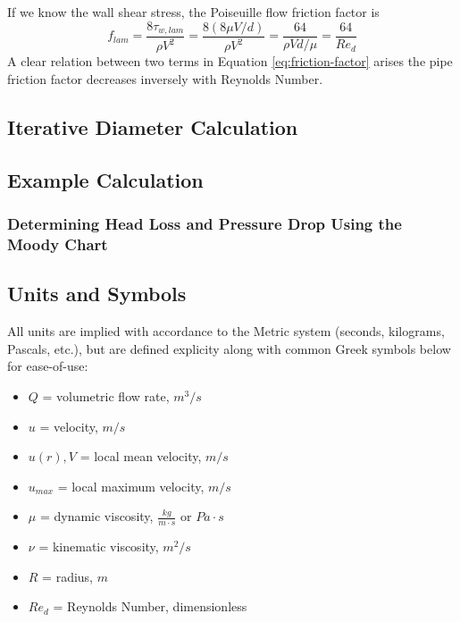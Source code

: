 \documentclass[11pt]{article} %
\numberwithin{equation}{section} %
\begin{document}
If we know the wall shear stress, the Poiseuille flow friction factor is
\begin{equation} \label{eq:friction-factor}
f_{lam} = \frac{8 \tau_{w, lam}}{\rho V^{2}} = \frac{8(8 \mu V/d)}{\rho V^{2}} = \frac{64}{\rho V d/\mu} = \frac{64}{Re_{d}}
\end{equation}	
A clear relation between two terms in Equation \ref{eq:friction-factor} arises \textemdash{} the pipe friction factor decreases inversely with Reynolds Number.
\subsection{Iterative Diameter Calculation}
\subsection{Example Calculation}
\subsubsection{Determining Head Loss and Pressure Drop Using the Moody Chart}

\subsection{Units and Symbols} \label{sec:units}
All units are implied with accordance to the Metric system (seconds, kilograms, Pascals, etc.), but are defined explicity along with common Greek symbols below for ease-of-use:
\begin{itemize}%
\item $Q$ = volumetric flow rate, $m^{3}/s$
\item $u$ = velocity, $m/s$ 
\item $u(r), V$ = local mean velocity, $m/s$ 
\item $u_{max}$ = local maximum velocity, $m/s$ 
\item $\mu$ = dynamic viscosity, $\frac{kg}{m \cdot s}$ or $Pa \cdot s$
\item $\nu$ = kinematic viscosity, $m^{2}/s$
\item $R$ = radius, $m$
\item $Re_{d}$ = Reynolds Number, dimensionless%

\end{itemize}
\printbibliography
\end{document}
